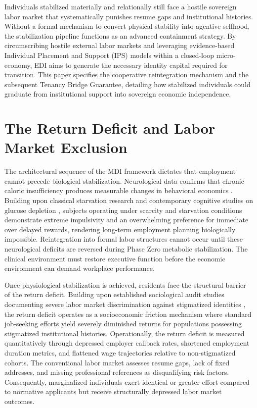 \documentclass[12pt, letterpaper]{article}
\begin{document}
Individuals stabilized materially and relationally still face a hostile sovereign labor market that systematically punishes resume gaps and institutional histories. Without a formal mechanism to convert physical stability into agentive selfhood, the stabilization pipeline functions as an advanced containment strategy. By circumscribing hostile external labor markets and leveraging evidence-based Individual Placement and Support (IPS) models within a closed-loop micro-economy, EDI aims to generate the necessary identity capital required for transition. This paper specifies the cooperative reintegration mechanism and the subsequent Tenancy Bridge Guarantee, detailing how stabilized individuals could graduate from institutional support into sovereign economic independence.

\section{The Return Deficit and Labor Market Exclusion}

The architectural sequence of the MDI framework dictates that employment cannot precede biological stabilization. Neurological data confirms that chronic caloric insufficiency produces measurable changes in behavioral economics \cite{mullainathan2013scarcity}. Building upon classical starvation research \cite{keys1950biology} and contemporary cognitive studies on glucose depletion \cite{gailliot2007self}, subjects operating under scarcity and starvation conditions demonstrate extreme impulsivity and an overwhelming preference for immediate over delayed rewards, rendering long-term employment planning biologically impossible. Reintegration into formal labor structures cannot occur until these neurological deficits are reversed during Phase Zero metabolic stabilization. The clinical environment must restore executive function before the economic environment can demand workplace performance.

Once physiological stabilization is achieved, residents face the structural barrier of the return deficit. Building upon established sociological audit studies documenting severe labor market discrimination against stigmatized identities \cite{pager2003mark}, the return deficit operates as a socioeconomic friction mechanism where standard job-seeking efforts yield severely diminished returns for populations possessing stigmatized institutional histories. Operationally, the return deficit is measured quantitatively through depressed employer callback rates, shortened employment duration metrics, and flattened wage trajectories relative to non-stigmatized cohorts. The conventional labor market assesses resume gaps, lack of fixed addresses, and missing professional references as disqualifying risk factors. Consequently, marginalized individuals exert identical or greater effort compared to normative applicants but receive structurally depressed labor market outcomes.
\end{document}
